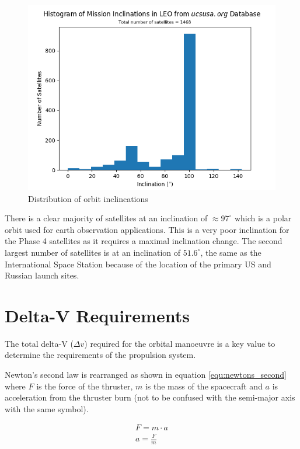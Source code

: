 \documentclass[a4paper, article, oneside, UKenglish]{memoir}
\newcommand{\0}{\mathbf{0}}
\newcommand{\1}{\mathbf{1}}
\begin{document}
\begin{figure}[h]
    \centering
    \includegraphics[width=\textwidth]{inclination_histogram}
    \caption{Distribution of orbit inclincations}
    \label{fig:inclination_histogram}
\end{figure}

There is a clear majority of satellites at an inclination of $ \approx 97^{\circ} $ which is a polar orbit used for earth observation applications.  This is a very poor inclination for the Phase 4 satellites as it requires a maximal inclination change. The second largest number of satellites is at an inclination of $ 51.6^{\circ} $, the same as the International Space Station because of the location of the primary US and Russian launch sites.

\section{Delta-V Requirements}

The total delta-V ($\Delta v$) required for the orbital manoeuvre is a key value to determine the requirements of the propulsion system.  

Newton's second law is rearranged as shown in equation \ref{equ:newtons_second} where $ F $ is the force of the thruster, $ m $ is the mass of the spacecraft and $ a $ is acceleration from the thruster burn (not to be confused with the semi-major axis with the same symbol).

\begin{equation}
\begin{split}
F = m \cdot a \\ 
a = \frac{F}{m}
\label{equ:newtons_second}
\end{split}
\end{equation}
\end{document}
